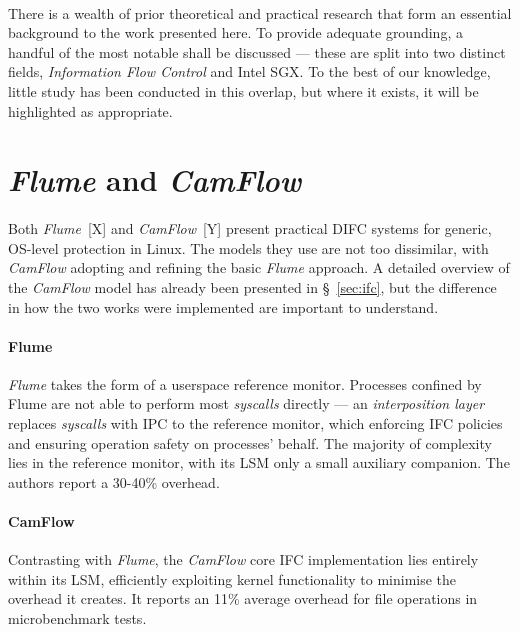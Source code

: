 \paragraph{} There is a wealth of prior theoretical and practical research that form an essential background to the work presented here. To provide adequate grounding, a handful of the most notable shall be discussed --- these are split into two distinct fields, \textit{Information Flow Control} and Intel SGX. To the best of our knowledge, little study has been conducted in this overlap, but where it exists, it will be highlighted as appropriate.


\section{\textit{Flume} and \textit{CamFlow}}
\paragraph{} Both \textit{Flume}~[X] and \textit{CamFlow}~[Y] present practical DIFC systems for generic, OS-level protection in Linux. The models they use are not too dissimilar, with \textit{CamFlow} adopting and refining the basic \textit{Flume} approach. A detailed overview of the \textit{CamFlow} model has already been presented in §~\ref{sec:ifc}, but the difference in how the two works were implemented are important to understand.

\paragraph{Flume} \textit{Flume} takes the form of a userspace reference monitor. Processes confined by Flume are not able to perform most \textit{syscalls} directly --- an \textit{interposition layer} replaces \textit{syscalls} with IPC to the reference monitor, which enforcing IFC policies and ensuring operation safety on processes' behalf. The majority of complexity lies in the reference monitor, with its LSM only a small auxiliary companion. The authors report a 30-40\% overhead.

\paragraph{CamFlow} Contrasting with \textit{Flume}, the \textit{CamFlow} core IFC implementation lies entirely within its LSM, efficiently exploiting kernel functionality to minimise the overhead it creates. It reports an 11\% average overhead for file operations in microbenchmark tests.


